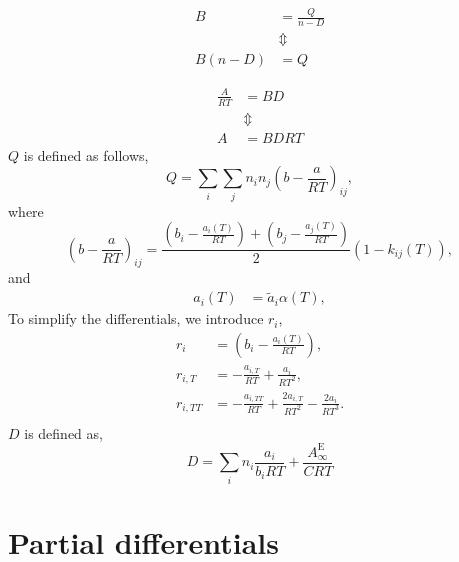 \documentclass[english]{../thermomemo/thermomemo}
\newcommand{\excess}{\text{E}}
\begin{document}
\begin{align}
  B &= \frac{Q}{n-D}   \label{eq:bm}\\
  &\Updownarrow \nonumber\\
  B(n-D) &= Q\label{eq:bm_diff}
\end{align}

\begin{align}
  \frac{A}{RT} &= BD
  \label{eq:am}\\
  &\Updownarrow \nonumber\\
  A &= BDRT
  \label{eq:am_diff}
\end{align}
$Q$ is defined as follows,
\begin{equation}
  Q = \underset{i}{\sum}\underset{j}{\sum}n_in_j\left(b-\frac{a}{RT}\right)_{ij},   \label{eq:Q}
\end{equation}
where
\begin{equation}
\left(b-\frac{a}{RT}\right)_{ij} =\frac{\left(b_i-\frac{a_i(T)}{RT}\right) + \left(b_j-\frac{a_j(T)}{RT}\right)}{2}\left(1-k_{ij}\left(T\right)\right),
\end{equation}
and
\begin{align}
   a_{i}(T) &= \tilde{a}_i \alpha(T),   \label{eq:aai}
\end{align}
To simplify the differentials, we introduce $r_i$,
\begin{align}
  r_i&=\left(b_i-\frac{a_i(T)}{RT}\right),\\
  r_{i,T}&=-\frac{a_{i,T}}{RT} + \frac{a_i}{RT^2},\\
  r_{i,TT}&=-\frac{a_{i,TT}}{RT} + \frac{2a_{i,T}}{RT^2} - \frac{2a_{i}}{RT^3}.\\
\end{align}
$D$ is defined as,
\begin{equation}
  D = \underset{i}{\sum}n_i\frac{a_i}{b_iRT} + \frac{A_\infty^\excess}{CRT} \label{eq:D}
\end{equation}
\section{Partial differentials}
\end{document}
